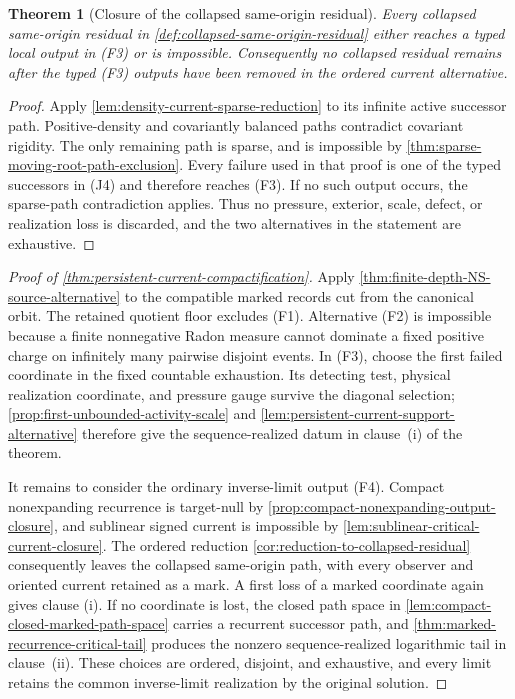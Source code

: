 \documentclass[11pt]{amsart}
\numberwithin{equation}{section}
\theoremstyle{plain}
\newtheorem{theorem}{Theorem}[section]
\theoremstyle{definition}
\theoremstyle{remark}
\begin{document}
\begin{theorem}[Closure of the collapsed same-origin residual]
\label{thm:collapsed-same-origin-residual-exclusion}
Every collapsed same-origin residual in
\cref{def:collapsed-same-origin-residual} either reaches a typed local output
in \textup{(F3)} or is impossible.  Consequently no collapsed residual
remains after the typed \textup{(F3)} outputs have been removed in the ordered
current alternative.
\end{theorem}

\begin{proof}
Apply \cref{lem:density-current-sparse-reduction} to its infinite active
successor path.  Positive-density and covariantly balanced paths contradict
covariant rigidity.  The only remaining path is sparse, and is impossible by
\cref{thm:sparse-moving-root-path-exclusion}.  Every failure used in that
proof is one of the typed successors in \textup{(J4)} and therefore reaches
\textup{(F3)}.  If no such output occurs, the sparse-path contradiction
applies.  Thus no pressure, exterior, scale, defect, or realization loss is
discarded, and the two alternatives in the statement are exhaustive.
\end{proof}

\begin{proof}[Proof of \cref{thm:persistent-current-compactification}]
Apply \cref{thm:finite-depth-NS-source-alternative} to the compatible marked
records cut from the canonical orbit.  The retained quotient floor excludes
\textup{(F1)}.  Alternative \textup{(F2)} is impossible because a finite
nonnegative Radon measure cannot dominate a fixed positive charge on
infinitely many pairwise disjoint events.  In \textup{(F3)}, choose the first
failed coordinate in the fixed countable exhaustion.  Its detecting test,
physical realization coordinate, and pressure gauge survive the diagonal
selection; \cref{prop:first-unbounded-activity-scale} and
\cref{lem:persistent-current-support-alternative} therefore give the
sequence-realized datum in clause~\textup{(i)} of the theorem.

It remains to consider the ordinary inverse-limit output \textup{(F4)}.
Compact nonexpanding recurrence is target-null by
\cref{prop:compact-nonexpanding-output-closure}, and sublinear signed current
is impossible by \cref{lem:sublinear-critical-current-closure}.  The ordered
reduction \cref{cor:reduction-to-collapsed-residual} consequently leaves the
collapsed same-origin path, with every observer and oriented current retained
as a mark.  A first loss of a marked coordinate again gives clause
\textup{(i)}.  If no coordinate is lost, the closed path space in
\cref{lem:compact-closed-marked-path-space} carries a recurrent successor
path, and \cref{thm:marked-recurrence-critical-tail} produces the nonzero
sequence-realized logarithmic tail in clause~\textup{(ii)}.  These choices
are ordered, disjoint, and exhaustive, and every limit retains the common
inverse-limit realization by the original solution.
\end{proof}
\end{document}
